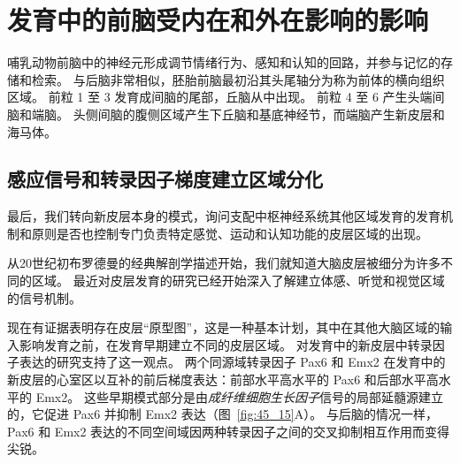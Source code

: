 \section{发育中的前脑受内在和外在影响的影响}

哺乳动物前脑中的神经元形成调节情绪行为、感知和认知的回路，并参与记忆的存储和检索。
与后脑非常相似，胚胎前脑最初沿其头尾轴分为称为前体的横向组织区域。
前粒 1 至 3 发育成间脑的尾部，丘脑从中出现。
前粒 4 至 6 产生头端间脑和端脑。
头侧间脑的腹侧区域产生下丘脑和基底神经节，而端脑产生新皮层和海马体。



\subsection{感应信号和转录因子梯度建立区域分化}

最后，我们转向新皮层本身的模式，询问支配中枢神经系统其他区域发育的发育机制和原则是否也控制专门负责特定感觉、运动和认知功能的皮层区域的出现。


从20世纪初布罗德曼的经典解剖学描述开始，我们就知道大脑皮层被细分为许多不同的区域。
最近对皮层发育的研究已经开始深入了解建立体感、听觉和视觉区域的信号机制。


现在有证据表明存在皮层“原型图”，这是一种基本计划，其中在其他大脑区域的输入影响发育之前，在发育早期建立不同的皮层区域。
对发育中的新皮层中转录因子表达的研究支持了这一观点。
两个同源域转录因子 Pax6 和 Emx2 在发育中的新皮层的心室区以互补的前后梯度表达：前部水平高水平的 Pax6 和后部水平高水平的 Emx2。
这些早期模式部分是由\textit{成纤维细胞生长因子}信号的局部延髓源建立的，它促进 Pax6 并抑制 Emx2 表达（图~\ref{fig:45_15}A）。
与后脑的情况一样，Pax6 和 Emx2 表达的不同空间域因两种转录因子之间的交叉抑制相互作用而变得尖锐。


